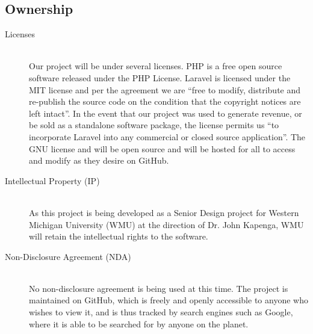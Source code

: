 \documentclass{report}
\begin{document}
\subsection*{Ownership}
\begin{description}
\item [Licenses] \hfill \\
Our project will be under several licenses. PHP is a free open source software released under the PHP License.
Laravel is licensed under the MIT license and per the agreement we are “free to modify, distribute and re-publish the source code on the condition that the copyright notices are left intact”.
In the event that our project was used to generate revenue, or be sold as a standalone software package, the license permits us “to incorporate Laravel into any commercial or closed source application”.  
The GNU license and will be open source and will be hosted for all to access and modify as they desire on GitHub.
\item [Intellectual Property (IP)] \hfill \\
As this project is being developed as a Senior Design project for Western Michigan University (WMU) at the direction of Dr. John Kapenga, WMU will retain the intellectual rights to the software.
\item [Non-Disclosure Agreement (NDA)] \hfill \\
No non-disclosure agreement is being used at this time.  The project is maintained on GitHub, which is freely and openly accessible to anyone who wishes to view it, and is thus tracked by search engines such as Google, where it is able to be searched for by anyone on the planet.
\end{description}
\end{document}
